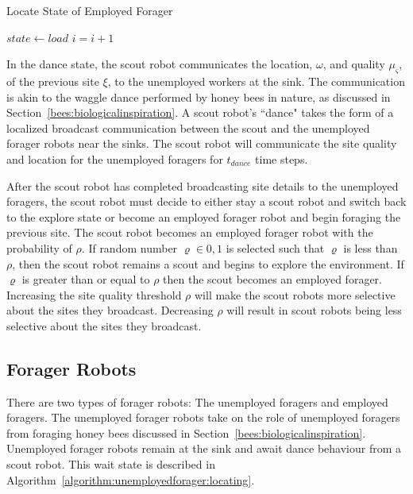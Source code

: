 \begin{algorithm}
\caption{Locate State of Employed Forager}
\label{algorithm:employedforager:locating}
\begin{algorithmic}[1]
	\State {}
	\State {}
		\State $state \gets load$
	\EndIf
	\State $i =i + 1$
\EndFunction
\end{algorithmic}
\end{algorithm}

In the dance state, the scout robot communicates the location, $\omega$, and quality $\mu_\varsigma$, of the previous site $\xi$, to the unemployed workers at the sink. The communication is akin to the waggle dance performed by honey bees in nature, as discussed in Section~\ref{bees:biologicalinspiration}. A scout robot's ``dance" takes the form of a localized broadcast communication between the scout and the unemployed forager robots near the sinks. The scout robot will communicate the site quality and location for the unemployed foragers for $t_{dance}$ time steps.

After the scout robot has completed broadcasting site details to the unemployed foragers, the scout robot must decide to either stay a scout robot and switch back to the explore state or become an employed forager robot and begin foraging the previous site. The scout robot becomes an employed forager robot with the probability of $\rho$. If random number $\varrho\in{0,1}$ is selected such that $\varrho$ is less than $\rho$, then the scout robot remains a scout and begins to explore the environment. If $\varrho$ is greater than or equal to $\rho$ then the scout becomes an employed forager. Increasing the site quality threshold $\rho$ will make the scout robots more selective about the sites they broadcast. Decreasing $\rho$ will result in scout robots being less selective about the sites they broadcast.

\subsection{Forager Robots}
\label{foragerrobots}

There are two types of forager robots: The unemployed foragers and employed foragers. The unemployed forager robots take on the role of unemployed foragers from foraging honey bees discussed in Section~\ref{bees:biologicalinspiration}. Unemployed forager robots remain at the sink and await dance behaviour from a scout robot. This wait state is described in Algorithm~\ref{algorithm:unemployedforager:locating}.

